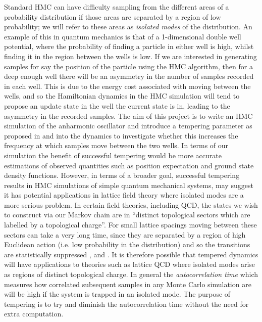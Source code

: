 \documentclass[12pt]{article}
\begin{document}
 Standard HMC can have difficulty sampling from the different areas of a probability distribution if those areas are separated by a region of low probability; we will refer to these areas as \textit{isolated modes} of the distribution. An example of this in quantum mechanics is that of a 1-dimensional double well potential, where the probability of finding a particle in either well is high, whilst finding it in the region between the wells is low. If we are interested in generating samples for say the position of the particle using the HMC algorithm, then for a deep enough well there will be an asymmetry in the number of samples recorded in each well. This is due to the energy cost associated with moving between the wells, and so the Hamiltonian dynamics in the HMC simulation will tend to propose an update state in the well the current state is in, leading to the asymmetry in the recorded samples. The aim of this project is to write an HMC simulation of the anharmonic oscillator and introduce a tempering parameter as proposed in \cite{neal_2011} and \cite{neal_1996_b} into the dynamics to investigate whether this increases the frequency at which samples move between the two wells. In terms of our simulation the benefit of successful tempering would be more accurate estimations of observed quantities such as position expectation and ground state density functions. However, in terms of a broader goal, successful tempering results in HMC simulations of simple quantum mechanical systems, may suggest it has potential applications in lattice field theory where isolated modes are a more serious problem. In certain field theories, including QCD, the states we wish to construct via our Markov chain are in ``distinct topological sectors which are labelled by a topological charge''\cite{bietenholz_2016}. For small lattice spacings moving between these sectors can take a very long time, since they are separated by a region of high Euclidean action (i.e. low probability in the distribution) and so the transitions are statistically suppressed \cite{bietenholz_2016}, \cite{debbio_panagopoulos_vicari_2002} and \cite{debbio_manca_vicari_2004}. It is therefore possible that tempered dynamics will have applications to theories such as lattice QCD where isolated modes arise as regions of distinct topological charge. In general the \textit{autocorrelation time} which measures how correlated subsequent samples in any Monte Carlo simulation are will be high if the system is trapped in an isolated mode. The purpose of tempering is to try and diminish the autocorrelation time without the need for extra computation. 
\end{document}
